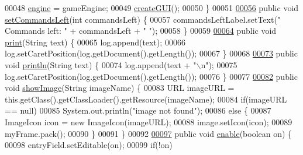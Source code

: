 \begin{DoxyCode}
00048         \hyperlink{classUserInterface_a661433c9712933f89b2cf30dfb10ffef}{engine} = gameEngine;
00049         \hyperlink{classUserInterface_a5aa4ca5e24c9fce93ef91e5a6d0abd60}{createGUI}();
00050     \}
00051 
\hypertarget{UserInterface_8java_source_l00056}{}\hyperlink{classUserInterface_ad12f31e49e7ed0904bc51ad330e55147}{00056}     \textcolor{keyword}{public} \textcolor{keywordtype}{void} \hyperlink{classUserInterface_ad12f31e49e7ed0904bc51ad330e55147}{setCommandsLeft}(\textcolor{keywordtype}{int} commandsLeft) \{
00057         commandsLeftLabel.setText(\textcolor{stringliteral}{" Commands left: "} + commandsLeft + \textcolor{stringliteral}{"  "});
00058     \}
00059 
\hypertarget{UserInterface_8java_source_l00064}{}\hyperlink{classUserInterface_a7a0de5ce2b0e0d25ba6573e87c63c1de}{00064}     \textcolor{keyword}{public} \textcolor{keywordtype}{void} \hyperlink{classUserInterface_a7a0de5ce2b0e0d25ba6573e87c63c1de}{print}(String text) \{
00065         log.append(text);
00066         log.setCaretPosition(log.getDocument().getLength());
00067     \}
00068 
\hypertarget{UserInterface_8java_source_l00073}{}\hyperlink{classUserInterface_a79f606b4b1f5d1523e50eea00039ed94}{00073}     \textcolor{keyword}{public} \textcolor{keywordtype}{void} \hyperlink{classUserInterface_a79f606b4b1f5d1523e50eea00039ed94}{println}(String text) \{
00074         log.append(text + \textcolor{stringliteral}{"\(\backslash\)n"});
00075         log.setCaretPosition(log.getDocument().getLength());
00076     \}
00077 
\hypertarget{UserInterface_8java_source_l00082}{}\hyperlink{classUserInterface_ab793a0f12878c698ba3e1720a9f86f3b}{00082}     \textcolor{keyword}{public} \textcolor{keywordtype}{void} \hyperlink{classUserInterface_ab793a0f12878c698ba3e1720a9f86f3b}{showImage}(String imageName) \{
00083         URL imageURL = this.getClass().getClassLoader().getResource(imageName);
00084         \textcolor{keywordflow}{if}(imageURL == null)
00085             System.out.println(\textcolor{stringliteral}{"image not found"});
00086         \textcolor{keywordflow}{else} \{
00087             ImageIcon icon = \textcolor{keyword}{new} ImageIcon(imageURL);
00088             image.setIcon(icon);
00089             myFrame.pack();
00090         \}
00091     \}
00092 
\hypertarget{UserInterface_8java_source_l00097}{}\hyperlink{classUserInterface_ab9e499c6c847d52c8753f08d62f1adfc}{00097}     \textcolor{keyword}{public} \textcolor{keywordtype}{void} \hyperlink{classUserInterface_ab9e499c6c847d52c8753f08d62f1adfc}{enable}(\textcolor{keywordtype}{boolean} on) \{
00098         entryField.setEditable(on);
00099         \textcolor{keywordflow}{if}(!on)

\end{DoxyCode}
